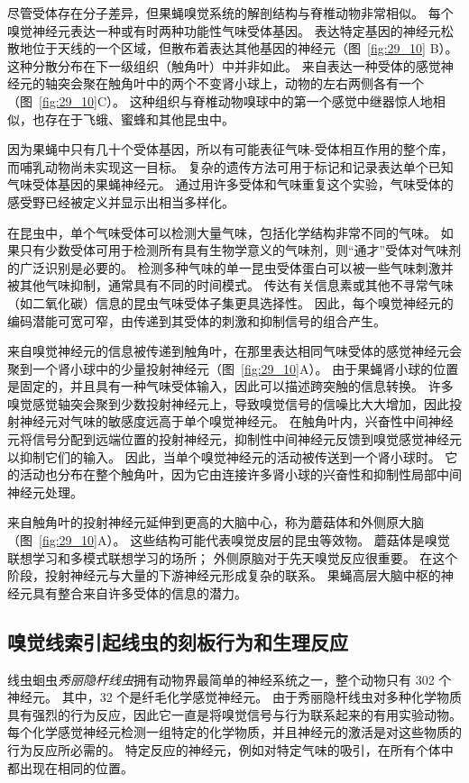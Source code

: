 尽管受体存在分子差异，但果蝇嗅觉系统的解剖结构与脊椎动物非常相似。
每个嗅觉神经元表达一种或有时两种功能性气味受体基因。
表达特定基因的神经元松散地位于天线的一个区域，但散布着表达其他基因的神经元（图~\ref{fig:29_10} B）。
这种分散分布在下一级组织（触角叶）中并非如此。
来自表达一种受体的感觉神经元的轴突会聚在触角叶中的两个不变肾小球上，动物的左右两侧各有一个（图~\ref{fig:29_10}C）。
这种组织与脊椎动物嗅球中的第一个感觉中继器惊人地相似，也存在于飞蛾、蜜蜂和其他昆虫中。


因为果蝇中只有几十个受体基因，所以有可能表征气味-受体相互作用的整个库，而哺乳动物尚未实现这一目标。
复杂的遗传方法可用于标记和记录表达单个已知气味受体基因的果蝇神经元。
通过用许多受体和气味重复这个实验，气味受体的感受野已经被定义并显示出相当多样化。


在昆虫中，单个气味受体可以检测大量气味，包括化学结构非常不同的气味。
如果只有少数受体可用于检测所有具有生物学意义的气味剂，则“通才”受体对气味剂的广泛识别是必要的。
检测多种气味的单一昆虫受体蛋白可以被一些气味刺激并被其他气味抑制，通常具有不同的时间模式。
传达有关信息素或其他不寻常气味（如二氧化碳）信息的昆虫气味受体子集更具选择性。
因此，每个嗅觉神经元的编码潜能可宽可窄，由传递到其受体的刺激和抑制信号的组合产生。


来自嗅觉神经元的信息被传递到触角叶，在那里表达相同气味受体的感觉神经元会聚到一个肾小球中的少量投射神经元（图~\ref{fig:29_10}A）。
由于果蝇肾小球的位置是固定的，并且具有一种气味受体输入，因此可以描述跨突触的信息转换。
许多嗅觉感觉轴突会聚到少数投射神经元上，导致嗅觉信号的信噪比大大增加，因此投射神经元对气味的敏感度远高于单个嗅觉神经元。
在触角叶内，兴奋性中间神经元将信号分配到远端位置的投射神经元，抑制性中间神经元反馈到嗅觉感觉神经元以抑制它们的输入。
因此，当单个嗅觉神经元的活动被传送到一个肾小球时。 它的活动也分布在整个触角叶，因为它由连接许多肾小球的兴奋性和抑制性局部中间神经元处理。


来自触角叶的投射神经元延伸到更高的大脑中心，称为蘑菇体和外侧原大脑（图~\ref{fig:29_10}A）。
这些结构可能代表嗅觉皮层的昆虫等效物。 蘑菇体是嗅觉联想学习和多模式联想学习的场所；
外侧原脑对于先天嗅觉反应很重要。
在这个阶段，投射神经元与大量的下游神经元形成复杂的联系。
果蝇高层大脑中枢的神经元具有整合来自许多受体的信息的潜力。


\subsection{嗅觉线索引起线虫的刻板行为和生理反应}

线虫蛔虫\textit{秀丽隐杆线虫}拥有动物界最简单的神经系统之一，整个动物只有 302 个神经元。
其中，32 个是纤毛化学感觉神经元。
由于秀丽隐杆线虫对多种化学物质具有强烈的行为反应，因此它一直是将嗅觉信号与行为联系起来的有用实验动物。
每个化学感觉神经元检测一组特定的化学物质，并且神经元的激活是对这些物质的行为反应所必需的。
特定反应的神经元，例如对特定气味的吸引，在所有个体中都出现在相同的位置。


